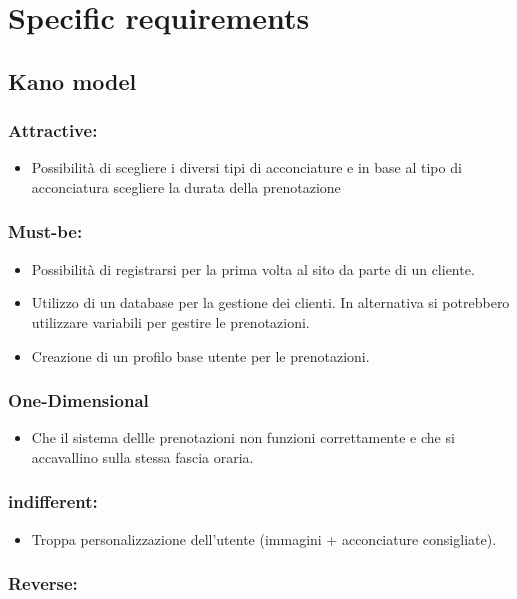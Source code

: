 \documentclass{article}
\begin{document}
\section {Specific requirements}

\subsection{Kano model}
\subsubsection{Attractive:}
\begin{itemize}
    \item Possibilità di scegliere i diversi tipi di acconciature e in 
    base al tipo di acconciatura scegliere la durata della prenotazione 
\end{itemize}
\subsubsection{Must-be:}
\begin{itemize}
    \item Possibilità di registrarsi per la prima volta al sito da parte di un cliente.
    \item Utilizzo di un database per la gestione dei clienti. In alternativa si potrebbero utilizzare 
    variabili per gestire le prenotazioni.
    \item Creazione di un profilo base utente per le prenotazioni.
\end{itemize}

\subsubsection{One-Dimensional}
\begin{itemize}
    \item Che il sistema dellle prenotazioni non funzioni correttamente 
    e che si accavallino sulla stessa fascia oraria.
\end{itemize}

\subsubsection{indifferent:}
\begin{itemize}
    \item Troppa personalizzazione dell'utente (immagini + acconciature consigliate).
\end{itemize}
\subsubsection{Reverse:}
\end{document}
